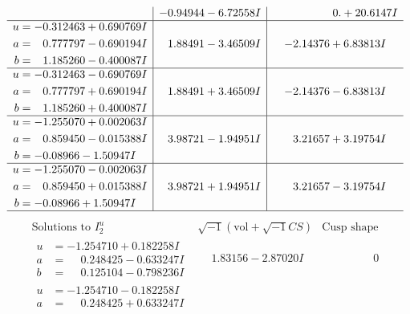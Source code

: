 \documentclass[1p]{elsarticle_modified}
\theoremstyle{definition}
\newcommand{\I}{\sqrt{-1}}
\begin{document}
$$\begin{array}{c|c|c}
 & -0.94944 - 6.72558 I & \phantom{-0.000000 -}0. + 20.6147 I \\ \hline\begin{aligned}
u &= -0.312463 + 0.690769 I \\
a &= \phantom{-}0.777797 - 0.690194 I \\
b &= \phantom{-}1.185260 - 0.400087 I\end{aligned}
 & \phantom{-}1.88491 - 3.46509 I & -2.14376 + 6.83813 I \\ \hline\begin{aligned}
u &= -0.312463 - 0.690769 I \\
a &= \phantom{-}0.777797 + 0.690194 I \\
b &= \phantom{-}1.185260 + 0.400087 I\end{aligned}
 & \phantom{-}1.88491 + 3.46509 I & -2.14376 - 6.83813 I \\ \hline\begin{aligned}
u &= -1.255070 + 0.002063 I \\
a &= \phantom{-}0.859450 - 0.015388 I \\
b &= -0.08966 - 1.50947 I\end{aligned}
 & \phantom{-}3.98721 - 1.94951 I & \phantom{-}3.21657 + 3.19754 I \\ \hline\begin{aligned}
u &= -1.255070 - 0.002063 I \\
a &= \phantom{-}0.859450 + 0.015388 I \\
b &= -0.08966 + 1.50947 I\end{aligned}
 & \phantom{-}3.98721 + 1.94951 I & \phantom{-}3.21657 - 3.19754 I\\
 \hline 
 \end{array}$$\newpage$$\begin{array}{c|c|c}  
\text{Solutions to }I^u_{2}& \I (\text{vol} + \sqrt{-1}CS) & \text{Cusp shape}\\
 \hline 
\begin{aligned}
u &= -1.254710 + 0.182258 I \\
a &= \phantom{-}0.248425 - 0.633247 I \\
b &= \phantom{-}0.125104 - 0.798236 I\end{aligned}
 & \phantom{-}1.83156 - 2.87020 I & \phantom{-0.000000 } 0 \\ \hline\begin{aligned}
u &= -1.254710 - 0.182258 I \\
a &= \phantom{-}0.248425 + 0.633247 I \\

\end{aligned}
\end{array}$$
\end{document}
